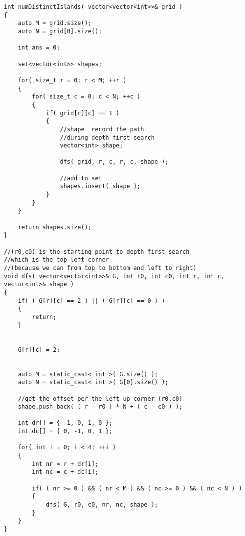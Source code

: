 \setcounter{lstlisting}{0}
\begin{lstlisting}[style=customc, caption={Record Path}]
int numDistinctIslands( vector<vector<int>>& grid )
{
    auto M = grid.size();
    auto N = grid[0].size();

    int ans = 0;

    set<vector<int>> shapes;

    for( size_t r = 0; r < M; ++r )
    {
        for( size_t c = 0; c < N; ++c )
        {
            if( grid[r][c] == 1 )
            {
                //shape  record the path
                //during depth first search
                vector<int> shape;

                dfs( grid, r, c, r, c, shape );

                //add to set
                shapes.insert( shape );
            }
        }
    }

    return shapes.size();
}

//(r0,c0) is the starting point to depth first search
//which is the top left corner
//(because we can from top to bottom and left to right)
void dfs( vector<vector<int>>& G, int r0, int c0, int r, int c, vector<int>& shape )
{
    if( ( G[r][c] == 2 ) || ( G[r][c] == 0 ) )
    {
        return;
    }


    G[r][c] = 2;


    auto M = static_cast< int >( G.size() );
    auto N = static_cast< int >( G[0].size() );

    //get the offset per the left up corner (r0,c0)
    shape.push_back( ( r - r0 ) * N + ( c - c0 ) );

    int dr[] = { -1, 0, 1, 0 };
    int dc[] = { 0, -1, 0, 1 };

    for( int i = 0; i < 4; ++i )
    {
        int nr = r + dr[i];
        int nc = c + dc[i];

        if( ( nr >= 0 ) && ( nr < M ) && ( nc >= 0 ) && ( nc < N ) )
        {
            dfs( G, r0, c0, nr, nc, shape );
        }
    }
}
\end{lstlisting}

